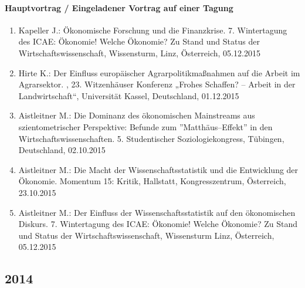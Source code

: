 \paragraph{Hauptvortrag / Eingeladener Vortrag auf einer Tagung}
\begin{enumerate}
	\item Kapeller J.: Ökonomische Forschung und die Finanzkrise. 7. Wintertagung des ICAE: Ökonomie! Welche Ökonomie? Zu Stand und Status der Wirtschaftswissenschaft, Wissensturm, Linz, Österreich, 05.12.2015
	\item Hirte K.: Der Einfluss europäischer Agrarpolitikmaßnahmen auf die Arbeit im Agrarsektor. , 23. Witzenhäuser Konferenz „Frohes Schaffen? – Arbeit in der Landwirtschaft“, Universität Kassel, Deutschland, 01.12.2015
	\item Aistleitner M.: Die Dominanz des ökonomischen Mainstreams aus szientometrischer Perspektive: Befunde zum ''Matthäus--Effekt'' in den Wirtschaftswissenschaften. 5. Studentischer Soziologiekongress, Tübingen, Deutschland, 02.10.2015
	\item Aistleitner M.: Die Macht der Wissenschaftsstatistik und die Entwicklung der Ökonomie. Momentum 15: Kritik, Hallstatt, Kongresszentrum, Österreich, 23.10.2015
	\item Aistleitner M.: Der Einfluss der Wissenschaftsstatistik auf den ökonomischen Diskurs. 7. Wintertagung des ICAE: Ökonomie! Welche Ökonomie? Zu Stand und Status der Wirtschaftswissenschaft, Wissensturm Linz, Österreich, 05.12.2015
\end{enumerate}
\subsection*{2014}
